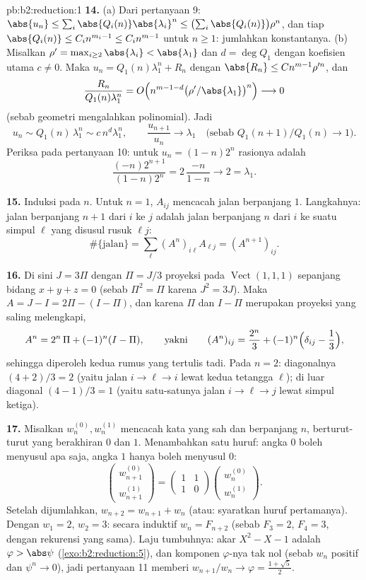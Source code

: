 \begin{solution}{pb:b2:reduction:1}
\textbf{14.} (a) Dari pertanyaan 9: $\abs{u_n} \leq \sum_i
\abs{Q_i(n)}\abs{\lambda_i}^n \leq \bigl(\sum_i
\abs{Q_i(n)}\bigr)\rho^n$, dan tiap $\abs{Q_i(n)} \leq C_i
n^{m_i - 1} \leq C_i n^{m-1}$ untuk $n \geq 1$: jumlahkan konstantanya.
(b) Misalkan $\rho' = \max_{i \geq 2}\abs{\lambda_i} <
\abs{\lambda_1}$ dan $d = \deg Q_1$ dengan koefisien utama $c
\neq 0$. Maka $u_n = Q_1(n)\lambda_1^n + R_n$ dengan $\abs{R_n}
\leq Cn^{m-1}\rho'^n$, dan
\[
\frac{R_n}{Q_1(n)\lambda_1^n} = O\Bigl(n^{m-1-d}
\bigl(\rho'/\abs{\lambda_1}\bigr)^n\Bigr) \longrightarrow 0
\]
(sebab geometri mengalahkan polinomial). Jadi
\[
u_n \sim Q_1(n)\,\lambda_1^n \sim c\,n^d\lambda_1^n,
\qquad
\frac{u_{n+1}}{u_n} \longrightarrow \lambda_1
\quad\text{(sebab } Q_1(n{+}1)/Q_1(n) \to 1\text{)}.
\]
Periksa pada pertanyaan 10: untuk $u_n = (1-n)2^n$ rasionya adalah
\[
\frac{(-n)2^{n+1}}{(1-n)2^n} = 2\,\frac{-n}{1-n}
\longrightarrow 2 = \lambda_1 .
\]

\textbf{15.} Induksi pada $n$. Untuk $n = 1$, $A_{ij}$ mencacah
jalan berpanjang $1$. Langkahnya: jalan berpanjang $n + 1$ dari $i$ ke
$j$ adalah jalan berpanjang $n$ dari $i$ ke suatu simpul $\ell$
yang disusul rusuk $\ell j$:
\[
\#\{\text{jalan}\} = \sum_{\ell} (A^n)_{i\ell}A_{\ell j} =
(A^{n+1})_{ij}.
\]

\textbf{16.} Di sini $J = 3\Pi$ dengan $\Pi = J/3$ proyeksi pada
$\operatorname{Vect}(1,1,1)$ sepanjang bidang $x + y + z = 0$
(sebab $\Pi^2 = \Pi$ karena $J^2 = 3J$). Maka $A = J - I = 2\Pi - (I -
\Pi)$, dan karena $\Pi$ dan $I - \Pi$ merupakan proyeksi yang saling
melengkapi,
\[
A^n = 2^n\,\Pi + (-1)^n (I - \Pi),
\qquad\text{yakni}\qquad
(A^n)_{ij} = \frac{2^n}3 + (-1)^n\Bigl(\delta_{ij} -
\frac13\Bigr),
\]
sehingga diperoleh kedua rumus yang tertulis tadi. Pada $n = 2$: diagonalnya
$(4 + 2)/3 = 2$ (yaitu jalan $i \to \ell \to i$ lewat kedua tetangga
$\ell$); di luar diagonal $(4 - 1)/3 = 1$ (yaitu satu-satunya jalan $i \to
\ell \to j$ lewat simpul ketiga).

\textbf{17.} Misalkan $w_n^{(0)}, w_n^{(1)}$ mencacah kata yang sah dan
berpanjang $n$, berturut-turut yang berakhiran $0$ dan $1$. Menambahkan
satu huruf: angka $0$ boleh menyusul apa saja, angka $1$ hanya boleh
menyusul $0$:
\[
\begin{pmatrix} w_{n+1}^{(0)}\\ w_{n+1}^{(1)}\end{pmatrix}
= \begin{pmatrix} 1 & 1\\ 1 & 0\end{pmatrix}
\begin{pmatrix} w_n^{(0)}\\ w_n^{(1)}\end{pmatrix}.
\]
Setelah dijumlahkan, $w_{n+2} = w_{n+1} + w_n$ (atau: syaratkan huruf
pertamanya). Dengan $w_1 = 2$, $w_2 = 3$: secara induktif $w_n = F_{n+2}$
(sebab $F_3 = 2$, $F_4 = 3$, dengan rekurensi yang sama). Laju tumbuhnya:
akar $X^2 - X - 1$ adalah $\varphi > \abs\psi$
(\cref{exo:b2:reduction:5}), dan komponen $\varphi$-nya
tak nol (sebab $w_n$ positif dan $\psi^n \to 0$), jadi pertanyaan
11 memberi $w_{n+1}/w_n \to \varphi = \frac{1 + \sqrt5}2$.


\end{solution}
